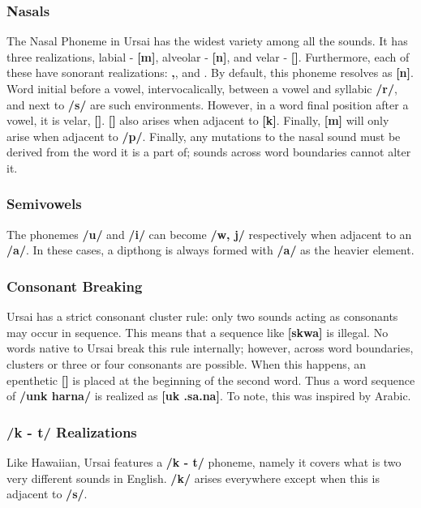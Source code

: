 \documentclass[11pt,letterpaper]{article}
\newcommand{\epsi}{\textipa{E}}
\newcommand{\engma}{\textipa{N}}
\newcommand{\flap}{\textipa{R}}
\newcommand{\nson}{\s{n}}
\newcommand{\mson}{\s{m}}
\newcommand{\engson}{\s{\engma}}
\begin{document}
		\subsubsection{Nasals}\label{nasal}
		\par
		The Nasal Phoneme in Ursai has the widest variety among all the sounds.  It has three realizations, labial - \textbf{[m]}, alveolar - \textbf{[n]}, and velar - \textbf{[\engma]}.  Furthermore, each of these have sonorant realizations: \textbf{\mson ,\space\nson}, and \textbf{\engson}.  By default, this phoneme resolves as \textbf{[n]}.  Word initial before a vowel, intervocalically, between a vowel and syllabic \textbf{/r/}, and next to \textbf{/s/} are such environments.  However, in a word final position after a vowel, it is velar, \textbf{[\engma]}.  \textbf{[\engma]} also arises when adjacent to \textbf{[k]}.  Finally, \textbf{[m]} will only arise when adjacent to \textbf{/p/}.  Finally, any mutations to the nasal sound must be derived from the word it is a part of; sounds across word boundaries cannot alter it.
		\subsubsection{Semivowels}\label{semivowel}
		\par
		The phonemes \textbf{/u/} and \textbf{/i/} can become \textbf{/w, j/} respectively when adjacent to an \textbf{/a/}.  In these cases, a dipthong is always formed with \textbf{/a/} as the heavier element.
		\subsubsection{Consonant Breaking}\label{breaking}
		\par
		Ursai has a strict consonant cluster rule: only two sounds acting as consonants may occur in sequence.  This means that a sequence like \textbf{[skwa]} is illegal.  No words native to Ursai break this rule internally; however, across word boundaries, clusters or three or four consonants are possible.  When this happens, an epenthetic \textbf{[\epsi]} is placed at the beginning of the second word.  Thus a word sequence of \textbf{/unk harna/} is realized as \textbf{[u\engma k \epsi .sa\flap .na]}.  To note, this was inspired by Arabic\cite{ArabicPhonology}.
		\subsubsection{/k - t/ Realizations}
		\par
		Like Hawaiian\cite{HawaiianPhonology}, Ursai features a \textbf{/k - t/} phoneme, namely it covers what is two very different sounds in English.  \textbf{/k/} arises everywhere except when this is adjacent to \textbf{/s/}.
\end{document}
